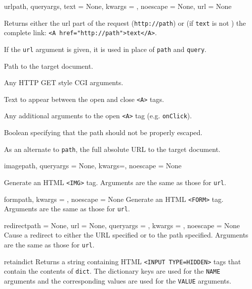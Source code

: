\documentclass{manual}
\begin{document}
\begin{funcdesc}{url}{path, queryargs, text = None, kwargs = {},
noescape = None, url = None}

Returns either the url part of the request (\texttt{http://path}) or
(if \texttt{text} is not \None) the complete link:
\verb!<A href="http://path">text</A>!. 

If the \texttt{url} argument is given, it is used in place of
\texttt{path} and \texttt{query}.

\begin{argdesc}
\item[path] Path to the target document.
\item[queryargs] Any HTTP GET style CGI arguments.
\item[text] Text to appear between the open and close \texttt{<A>} tags.
\item[kwargs] Any additional arguments to the open \texttt{<A>} tag
(e.g. \texttt{onClick}).
\item[noescape] Boolean specifying that the path should not be
properly escaped.
\item[url] As an alternate to \texttt{path}, the full absolute URL to the
target document.
\end{argdesc}
\end{funcdesc}


\begin{funcdesc}{image}{path, queryargs = None, kwargs={}, noescape = None}

Generate an HTML \texttt{<IMG>} tag.  Arguments are the same as those
for \texttt{url}.
\end{funcdesc}


\begin{funcdesc}{form}{path, kwargs = {}, noescape = None}
Generate an HTML \texttt{<FORM>} tag.  Arguments are the same as those
for \texttt{url}.
\end{funcdesc}


\begin{funcdesc}{redirect}{path = None, url = None, queryargs = {},
kwargs = {}, noescape = None} 
Cause a redirect to either the URL specified or to the path specified.
Arguments are the same as those for \texttt{url}.  
\end{funcdesc}

\begin{funcdesc}{retain}{dict}
Returns a string containing HTML \texttt{<INPUT TYPE=HIDDEN>} tags
that contain the contents of \texttt{dict}.  The dictionary keys are
used for the \texttt{NAME} arguments and the corresponding values are
used for the \texttt{VALUE} arguments.
\end{funcdesc}
\end{document}
